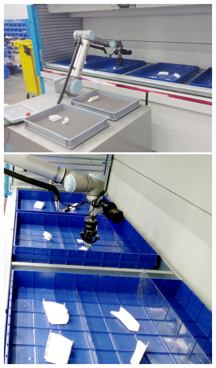 \begin{figure}[h!]
{\begin{tcolorbox}
	\includegraphics[height=.15\textheight]{Cap5/Figuras/picking_embraer/back-4}
	\includegraphics[height=.15\textheight]{Cap5/Figuras/picking_embraer/side-4}\\

\end{tcolorbox}}
\end{figure}
